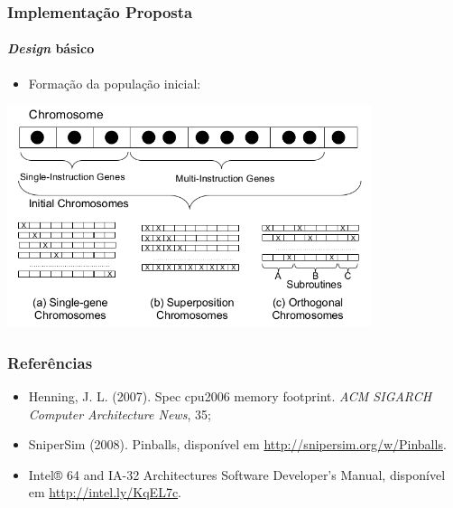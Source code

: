 \documentclass[10pt]{beamer}
\begin{document}
\begin{frame}
\frametitle{Implementação Proposta}
\framesubtitle{\textit{Design} básico}

\begin{itemize}
  \item Formação da população inicial:
\end{itemize}

 \centering
\includegraphics[width=0.8\textwidth]{images/initial}
\end{frame}

\begin{frame}
\frametitle{Referências}

\begin{itemize}
  \item Henning, J. L. (2007). Spec cpu2006 memory footprint. \textit{ACM
  SIGARCH Computer Architecture News}, 35;
  \vspace{14pt}
  \item SniperSim (2008). Pinballs, disponível em
  \url{http://snipersim.org/w/Pinballs}.
  \item Intel® 64 and IA-32 Architectures
Software Developer’s Manual, disponível em \url{http://intel.ly/KqEL7c}.
\end{itemize}

\end{frame}
\end{document}
